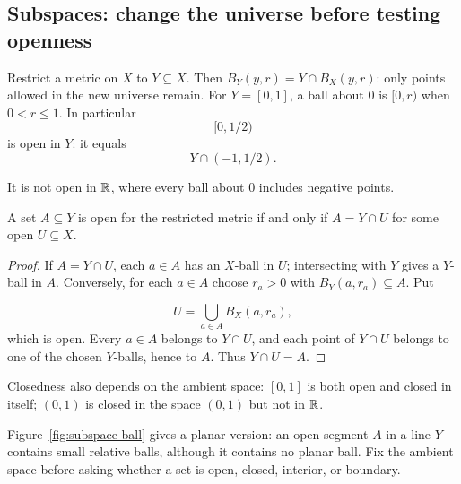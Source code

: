 \subsection{Subspaces: change the universe before testing openness}
Restrict a metric on $X$ to $Y\subseteq X$. Then
$B_Y(y,r)=Y\cap B_X(y,r)$: only points allowed in the new universe remain.
For $Y=[0,1]$, a ball about $0$ is $[0,r)$ when $0<r\leq1$.
In particular
\[
[0,1/2)
\]
 is open in $Y$: it equals
\[
Y\cap(-1,1/2).
\]

It is not open in $\mathbb{R}$, where every ball about $0$ includes negative points.
\begin{proposition}\label{prop:metric-subspace}
A set $A\subseteq Y$ is open for the restricted metric if and only if
$A=Y\cap U$ for some open $U\subseteq X$.
\end{proposition}
\begin{proof}
If $A=Y\cap U$, each $a\in A$ has an $X$-ball in $U$; intersecting
with $Y$ gives a $Y$-ball in $A$. Conversely, for each $a\in A$ choose
$r_a>0$ with $B_Y(a,r_a)\subseteq A$. Put

\[
U=\bigcup_{a\in A}B_X(a,r_a),
\]
 which is open. Every $a\in A$ belongs
to $Y\cap U$, and each point of $Y\cap U$ belongs to one of the chosen
$Y$-balls, hence to $A$. Thus $Y\cap U=A$.
\end{proof}
Closedness also depends on the ambient space: $[0,1]$ is both open and closed
in itself; $(0,1)$ is closed in the space $(0,1)$ but not in $\mathbb{R}$.

Figure~\ref{fig:subspace-ball} gives a planar version: an open segment
$A$ in a line $Y$ contains small relative balls, although it contains no
planar ball. Fix the ambient space before asking whether a set is open,
closed, interior, or boundary.


